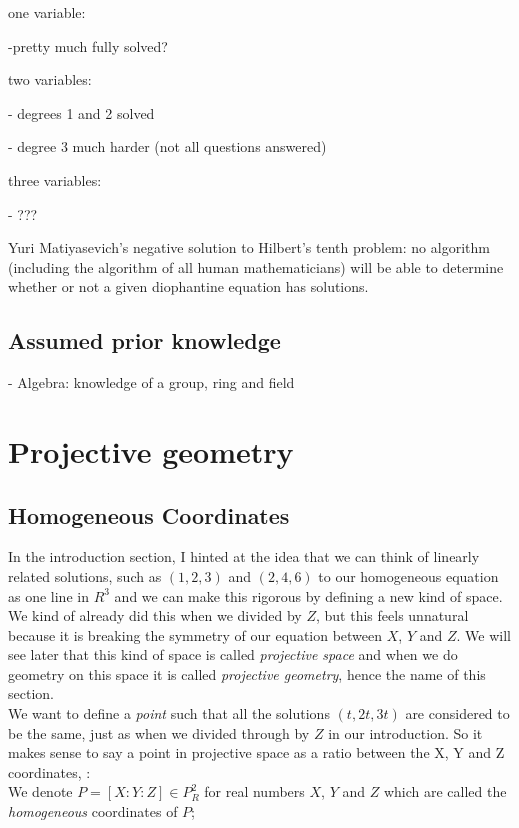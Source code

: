 \documentclass{article}
\begin{document}
one variable:

-pretty much fully solved?

two variables:

- degrees 1 and 2 solved

- degree 3 much harder (not all questions answered)

three variables:

- ???

Yuri Matiyasevich's negative solution to Hilbert's tenth problem: no algorithm (including the algorithm of all human mathematicians) will be able to determine whether or not a given diophantine equation has solutions.

\subsection{Assumed prior knowledge}

- Algebra: knowledge of a group, ring and field

\newpage

\section{Projective geometry}

\subsection{Homogeneous Coordinates}

In the introduction section, I hinted at the idea that we can think of linearly related solutions, such as $(1, 2, 3)$ and $(2, 4, 6)$ to our homogeneous equation  as one line in $R^3$ and we can make this rigorous by defining a new kind of space. We kind of already did this when we divided by $Z$, but this feels unnatural because it is breaking the symmetry of our equation between $X$, $Y$ and $Z$. We will see later that this kind of space is called \emph{projective space} and when we do geometry on this space it is called \emph{projective geometry}, hence the name of this section.\\

We want to define a \emph{point} such that all the solutions $(t, 2t, 3t)$ are considered to be the same, just as when we divided through by $Z$ in our introduction. So it makes sense to say a point in projective space as a ratio between the X, Y and Z coordinates, :\\

We denote $P = [X : Y : Z] \in P_R^2$ for real numbers $X$, $Y$ and $Z$ which are called the \emph{homogeneous} coordinates of $P$;\\
\end{document}
